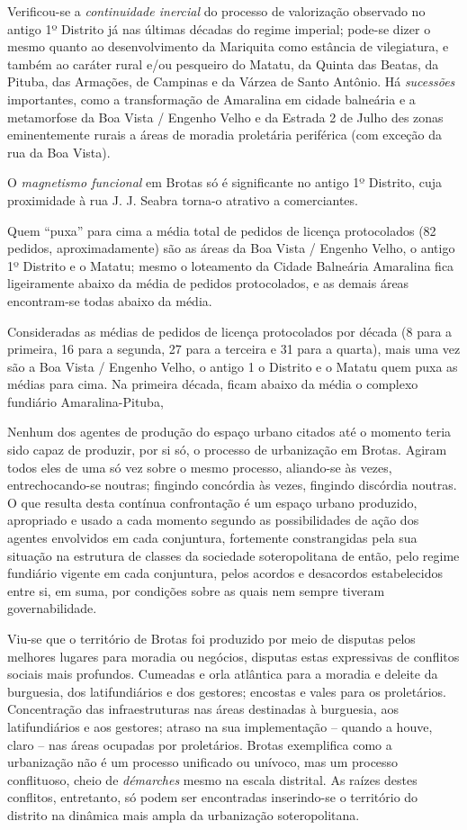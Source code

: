 Verificou-se a \textit{continuidade inercial} do processo de valorização observado no antigo 1º Distrito já nas últimas décadas do regime imperial; pode-se dizer o mesmo quanto ao desenvolvimento da Mariquita como estância de vilegiatura, e também ao caráter rural e/ou pesqueiro do Matatu, da Quinta das Beatas, da Pituba, das Armações, de Campinas e da Várzea de Santo Antônio. Há \textit{sucessões} importantes, como a transformação de Amaralina em cidade balneária e a metamorfose da Boa Vista / Engenho Velho e da Estrada 2 de Julho des zonas eminentemente rurais a áreas de moradia proletária periférica (com exceção da rua da Boa Vista).

O \textit{magnetismo funcional} em Brotas só é significante no antigo 1º Distrito, cuja proximidade à rua J. J. Seabra torna-o atrativo a comerciantes.

Quem ``puxa'' para cima a média total de pedidos de licença protocolados (82 pedidos, aproximadamente) são as áreas da Boa Vista / Engenho Velho, o antigo 1º Distrito e o Matatu; mesmo o loteamento da Cidade Balneária Amaralina fica ligeiramente abaixo da média de pedidos protocolados, e as demais áreas encontram-se todas abaixo da média.

Consideradas as médias de pedidos de licença protocolados por década (8 para a primeira, 16 para a segunda, 27 para a terceira e 31 para a quarta), mais uma vez são a Boa Vista / Engenho Velho, o antigo 1 o Distrito e o Matatu quem puxa as médias para cima. Na primeira década, ficam abaixo da média o complexo fundiário Amaralina-Pituba, 


Nenhum dos agentes de produção do espaço urbano citados até o momento teria sido capaz de produzir, por si só, o processo de urbanização em Brotas. Agiram todos eles de uma só vez sobre o mesmo processo, aliando-se às vezes, entrechocando-se noutras; fingindo concórdia às vezes, fingindo discórdia noutras. O que resulta desta contínua confrontação é um espaço urbano produzido, apropriado e usado a cada momento segundo as possibilidades de ação dos agentes envolvidos em cada conjuntura, fortemente constrangidas pela sua situação na estrutura de classes da sociedade soteropolitana de então, pelo regime fundiário vigente em cada conjuntura, pelos acordos e desacordos estabelecidos entre si, em suma, por condições sobre as quais nem sempre tiveram governabilidade.

Viu-se que o território de Brotas foi produzido por meio de disputas pelos melhores lugares para moradia ou negócios, disputas estas expressivas de conflitos sociais mais profundos. Cumeadas e orla atlântica para a moradia e deleite da burguesia, dos latifundiários e dos gestores; encostas e vales para os proletários. Concentração das infraestruturas nas áreas destinadas à burguesia, aos latifundiários e aos gestores; atraso na sua implementação – quando a houve, claro – nas áreas ocupadas por proletários. Brotas exemplifica como a urbanização não é um processo unificado ou unívoco, mas um processo conflituoso, cheio de \textit{démarches} mesmo na escala distrital. As raízes destes conflitos, entretanto, só podem ser encontradas inserindo-se o território do distrito na dinâmica mais ampla da urbanização soteropolitana.

